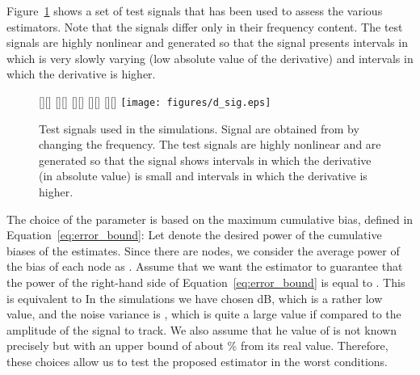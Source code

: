 \documentclass[a4paper,notitlepage,onecolumn]{article}
\numberwithin{equation}{section}
\begin{document}
Figure~\ref{fig:dsig} shows a set of test signals
 that has been used to assess the various
estimators. Note that the signals differ only in their frequency
content. The test signals are highly nonlinear and generated so
that the signal presents intervals in which is very slowly varying
(low absolute value of the derivative) and intervals in which the
derivative is higher.
\begin{figure}
    \centering
    [][]{}
    [][]{}
    [][]{}
    [][]{}
    [][]{}
    \texttt{[image: figures/d\_sig.eps]}
    \caption{Test signals used in the simulations. Signal  are obtained from  by changing the frequency. The test
    signals are highly nonlinear and are generated so that the signal shows intervals in which the derivative (in absolute value) is
    small and intervals in which the derivative is higher.}
    \label{fig:dsig}
\end{figure}
The choice of the parameter  is based on the
maximum cumulative bias, defined in
Equation~\eqref{eq:error_bound}: Let  denote the desired
power of the cumulative biases of the estimates. Since there are
 nodes, we consider the average power of the bias of each node
as . Assume that we want the estimator to
guarantee that the power of the right-hand side of
Equation~\eqref{eq:error_bound} is equal to . This is
equivalent to 
In the simulations we have chosen dB, which is a rather low value, and the noise variance is , which is quite a large value if compared to the amplitude of the signal to track. We also assume that he value of  is not known precisely but with an upper bound of about \% from its real value. Therefore, these choices allow us to test the proposed estimator in the worst conditions.
\end{document}
